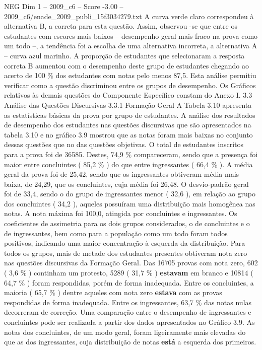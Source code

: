 \begin{textsample}{NEG Dim 1 – 2009\_c6 – Score -3.00 – 2009\_c6/enade\_2009\_publi\_15f3034279.txt}
A curva verde claro correspondeu à alternativa B, a correta para esta questão.
Assim, observou -se que entre os estudantes com escores mais baixos – desempenho geral mais fraco na prova como um todo –, a tendência foi a escolha de uma alternativa incorreta, a alternativa A – curva azul marinho.
A proporção de estudantes que selecionaram a resposta correta B aumentou com o desempenho deste grupo de estudantes chegando ao acerto de 100 \% dos estudantes com notas pelo menos 87,5.
Esta análise permitiu verificar como a questão discriminou entre os grupos de desempenho.
Os Gráficos relativos às demais questões do Componente Específico constam do Anexo I. 3.3 Análise das Questões Discursivas 3.3.1 Formação Geral A Tabela 3.10 apresenta as estatísticas básicas da prova por grupo de estudantes.
A análise dos resultados de desempenho dos estudantes nas questões discursivas que são apresentados na tabela 3.10 e no gráfico 3.9 mostrou que as notas foram mais baixas no conjunto dessas questões que no das questões objetivas.
O total de estudantes inscritos para a prova foi de 36585.
Destes, 74,9 \% compareceram, sendo que a presença foi maior entre concluintes ( 85,2 \% ) do que entre ingressantes ( 66,4 \% ).
A média geral da prova foi de 25,42, sendo que os ingressantes obtiveram média mais baixa, de 24,29, que os concluintes, cuja média foi 26,48.
O desvio-padrão geral foi de 33,4, sendo o do grupo de ingressantes menor ( 32,6 ), em relação ao grupo dos concluintes ( 34,2 ), aqueles possuíram uma distribuição mais homogênea nas notas.
A nota máxima foi 100,0, atingida por concluintes e ingressantes.
Os coeficientes de assimetria para os dois grupos considerados, o de concluintes e o de ingressantes, bem como para a população como um todo foram todos positivos, indicando uma maior concentração à esquerda da distribuição.
Para todos os grupos, mais de metade dos estudantes presentes obtiveram nota zero nas questões discursivas da Formação Geral.
Das 16705 provas com nota zero, 602 ( 3,6 \% ) continham um protesto, 5289 ( 31,7 \% ) \textbf{estavam} em branco e 10814 ( 64,7 \% ) foram respondidas, porém de forma inadequada.
Entre os concluintes, a maioria ( 65,7 \% ) dentre aqueles com nota zero \textbf{estava} com as provas respondidas de forma inadequada.
Entre os ingressantes, 63,7 \% das notas nulas decorreram de correção.
Uma comparação entre o desempenho de ingressantes e concluintes pode ser realizada a partir dos dados apresentados no Gráfico 3.9.
As notas dos concluintes, de um modo geral, foram ligeiramente mais elevadas do que as dos ingressantes, cuja distribuição de notas \textbf{está} a esquerda dos primeiros.

\end{textsample}
